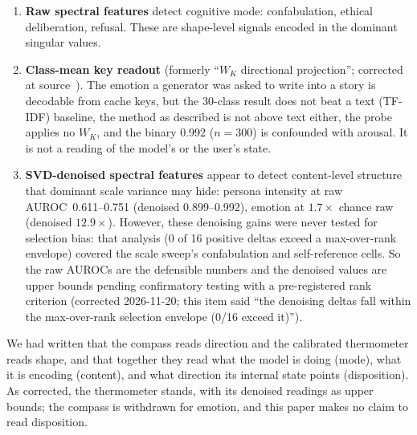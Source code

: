 \documentclass[11pt,a4paper]{article}
\begin{document}
\begin{enumerate}[nosep]
    \item \textbf{Raw spectral features} detect cognitive mode:
    confabulation, ethical deliberation, refusal. These are
    shape-level signals encoded in the dominant singular values.

    \item \textbf{Class-mean key readout} (formerly ``$W_K$ directional
    projection''; corrected at source~\citep{lyra_p4}). The emotion a
    generator was asked to write into a story is decodable from cache keys,
    but the 30-class result does not beat a text (TF-IDF) baseline, the
    method as described is not above text either, the probe applies no
    $W_K$, and the binary 0.992 ($n = 300$) is confounded with arousal. It
    is not a reading of the model's or the user's state.

    \item \textbf{SVD-denoised spectral features} appear to detect
    content-level structure that dominant scale variance may hide: persona
    intensity at raw AUROC~0.611--0.751 (denoised 0.899--0.992), emotion
    at $1.7\times$ chance raw (denoised $12.9\times$). However, these
    denoising gains were never tested for selection bias: that analysis
    (0 of 16 positive deltas exceed a max-over-rank envelope) covered the
    scale sweep's confabulation and self-reference cells. So the raw
    AUROCs are the defensible numbers and the denoised values are upper
    bounds pending confirmatory testing with a pre-registered rank
    criterion (corrected 2026-11-20; this item said ``the denoising
    deltas fall within the max-over-rank selection envelope (0/16 exceed
    it)'').
\end{enumerate}

We had written that the compass reads direction and the calibrated
thermometer reads shape, and that together they read what the model is
doing (mode), what it is encoding (content), and what direction its internal
state points (disposition). As corrected, the thermometer stands, with its
denoised readings as upper bounds; the compass is withdrawn for emotion, and
this paper makes no claim to read disposition.
\end{document}
